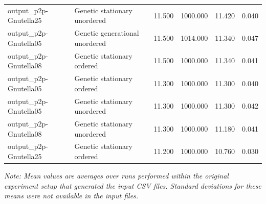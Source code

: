 \documentclass{article}
\begin{document}
\begin{table}[htbp]
{\begin{tabular}{ l l r r r r }
    output\_p2p-Gnutella25 & Genetic stationary unordered & 11.500 & 1000.000 & 11.420 & 0.040 \\
    output\_p2p-Gnutella05 & Genetic generational unordered & 11.500 & 1014.000 & 11.340 & 0.047 \\
    output\_p2p-Gnutella08 & Genetic stationary ordered & 11.500 & 1000.000 & 11.340 & 0.041 \\
    output\_p2p-Gnutella05 & Genetic stationary ordered & 11.300 & 1000.000 & 11.300 & 0.040 \\
    output\_p2p-Gnutella05 & Genetic stationary unordered & 11.300 & 1000.000 & 11.300 & 0.042 \\
    output\_p2p-Gnutella08 & Genetic stationary unordered & 11.300 & 1000.000 & 11.180 & 0.041 \\
    output\_p2p-Gnutella25 & Genetic stationary ordered & 11.200 & 1000.000 & 10.760 & 0.030 \\
    \bottomrule
  \end{tabular}%
  } %
\end{table}

\vspace{1em}

\bigskip
\textit{Note: Mean values are averages over runs performed within the original experiment setup that generated the input CSV files. Standard deviations for these means were not available in the input files.}
\end{document}
